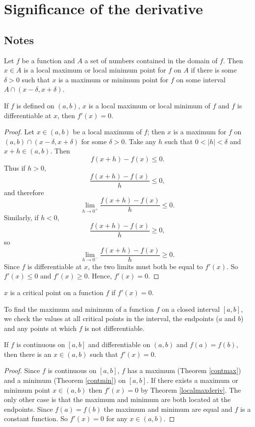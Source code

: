 \section{Significance of the derivative}

\subsection{Notes}
\begin{definition}
Let $f$ be a function and $A$ a set of numbers contained in the domain of $f$. Then $x \in A$ is a local maximum or local minimum point for $f$ on $A$ if there is some $\delta > 0$ such that $x$ is a maximum or minimum point for $f$ on some interval $A \cap (x - \delta, x + \delta)$.
\end{definition}

\begin{theorem} \label{localmaxderiv}
If $f$ is defined on $(a, b)$, $x$ is a local maximum or local minimum of $f$ and $f$ is differentiable at $x$, then $f'(x) = 0$.

\begin{proof}
Let $x \in (a, b)$ be a local maximum of $f$; then $x$ is a maximum for $f$ on $(a, b) \cap (x - \delta, x + \delta)$ for some $\delta > 0$. Take any $h$ such that $0 < |h| < \delta$ and $x + h \in (a, b)$. Then
\[ f(x+h) - f(x) \le 0. \]
Thus if $h > 0$,
\[ \frac{f(x+h)-f(x)}{h} \le 0, \]
and therefore
\[ \lim_{h \to 0^+} \frac{f(x+h)-f(x)}{h} \le 0. \]
Similarly, if $h < 0$,
\[ \frac{f(x+h)-f(x)}{h} \ge 0, \]
so
\[ \lim_{h \to 0^-} \frac{f(x+h)-f(x)}{h} \ge 0. \]
Since $f$ is differentiable at $x$, the two limits must both be equal to $f'(x)$. So $f'(x) \le 0$ and $f'(x) \ge 0$. Hence, $f'(x) = 0$.
\end{proof}
\end{theorem}

\begin{definition}
$x$ is a critical point on a function $f$ if $f'(x) = 0$. 
\end{definition}

To find the maximum and minimum of a function $f$ on a closed interval $[a, b]$, we check the values at all critical points in the interval, the endpoints ($a$ and $b$) and any points at which $f$ is not differentiable.

\begin{theorem} \label{rolle}
If $f$ is continuous on $[a, b]$ and differentiable on $(a, b)$ and $f(a)=f(b)$, then there is an $x \in (a, b)$ such that $f'(x) = 0$.

\begin{proof}
Since $f$ is continuous on $[a, b]$, $f$ has a maximum (Theorem \ref{contmax}) and a minimum (Theorem \ref{contmin}) on $[a, b]$. If there exists a maximum or minimum point $x \in (a, b)$ then $f'(x) = 0$ by Theorem \ref{localmaxderiv}. The only other case is that the maximum and minimum are both located at the endpoints. Since $f(a)=f(b)$ the maximum and minimum are equal and $f$ is a constant function. So $f'(x)=0$ for any $x \in (a, b)$.
\end{proof}
\end{theorem}

